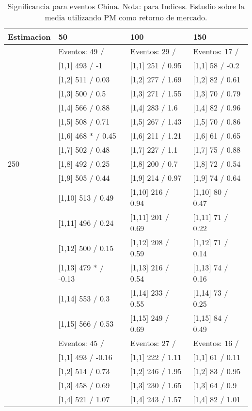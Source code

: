 \begin{table}

\caption{Significancia para eventos China. Nota: para Indices. Estudio sobre la media utilizando PM como retorno de mercado.}
\centering
\begin{tabular}[t]{llll}
\toprule
Estimacion & 50 & 100 & 150\\
\midrule
 & Eventos:  49 / & Eventos:  29 / & Eventos:  17 /\\
 & {}[1,1] 493  / -1 & {}[1,1] 251  / 0.95 & {}[1,1] 58  / -0.2\\
 & {}[1,2] 511  / 0.03 & {}[1,2] 277  / 1.69 & {}[1,2] 82  / 0.61\\
 & {}[1,3] 500  / 0.5 & {}[1,3] 271  / 1.55 & {}[1,3] 70  / 0.79\\
 & {}[1,4] 566  / 0.88 & {}[1,4] 283  / 1.6 & {}[1,4] 82  / 0.96\\
\addlinespace
 & {}[1,5] 508  / 0.71 & {}[1,5] 267  / 1.43 & {}[1,5] 70  / 0.86\\
 & {}[1,6] 468 * / 0.45 & {}[1,6] 211  / 1.21 & {}[1,6] 61  / 0.65\\
 & {}[1,7] 502  / 0.48 & {}[1,7] 227  / 1.1 & {}[1,7] 75  / 0.88\\
250 & {}[1,8] 492  / 0.25 & {}[1,8] 200  / 0.7 & {}[1,8] 72  / 0.54\\
 & {}[1,9] 505  / 0.44 & {}[1,9] 214  / 0.97 & {}[1,9] 74  / 0.64\\
\addlinespace
 & {}[1,10] 513  / 0.49 & {}[1,10] 216  / 0.94 & {}[1,10] 80  / 0.47\\
 & {}[1,11] 496  / 0.24 & {}[1,11] 201  / 0.69 & {}[1,11] 71  / 0.22\\
 & {}[1,12] 500  / 0.15 & {}[1,12] 208  / 0.59 & {}[1,12] 71  / 0.14\\
 & {}[1,13] 479 * / -0.13 & {}[1,13] 216  / 0.54 & {}[1,13] 74  / 0.16\\
 & {}[1,14] 553  / 0.3 & {}[1,14] 233  / 0.55 & {}[1,14] 73  / 0.25\\
\addlinespace
 & {}[1,15] 566  / 0.53 & {}[1,15] 249  / 0.69 & {}[1,15] 84  / 0.49\\
 & Eventos:  45 / & Eventos:  27 / & Eventos:  16 /\\
 & {}[1,1] 493  / -0.16 & {}[1,1] 222  / 1.11 & {}[1,1] 61  / 0.11\\
 & {}[1,2] 514  / 0.73 & {}[1,2] 246  / 1.95 & {}[1,2] 83  / 0.95\\
 & {}[1,3] 458  / 0.69 & {}[1,3] 230  / 1.65 & {}[1,3] 64  / 0.9\\
\addlinespace
 & {}[1,4] 521  / 1.07 & {}[1,4] 243  / 1.57 & {}[1,4] 82  / 1.01\\

\end{tabular}
\end{table}
